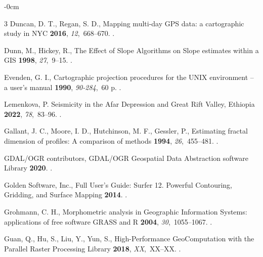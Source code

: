 \documentclass[technologies,article,submit,pdftex,moreauthors]{Definitions/mdpi}
\begin{document}
\begin{adjustwidth}{-\extralength}{0cm}
\begin{thebibliography}{3}
Duncan, D. T., Regan, S. D.,
\newblock Mapping multi-day GPS data: a cartographic study in NYC
 {\bf 2016}, {\em 12},~668--670. 
.

Dunn, M., Hickey, R.,
\newblock The Effect of Slope Algorithms on Slope estimates within a GIS
 {\bf 1998}, {\em 27},~9--15. 
.

Evenden, G. I.,
\newblock Cartographic projection procedures for the UNIX environment – a user's manual
 {\bf 1990}, {\em 90-284},~60 p. 
.

Lemenkova, P. 
\newblock Seismicity in the Afar Depression and Great Rift Valley, Ethiopia
 {\bf 2022}, {\em 78},~83--96. 
.

Gallant, J. C., Moore, I. D., Hutchinson, M. F., Gessler, P.,
\newblock Estimating fractal dimension of profiles: A comparison of methods
 {\bf 1994}, {\em 26},~455--481. 
.

 GDAL/OGR contributors,
\newblock GDAL/OGR Geospatial Data Abstraction software Library
 {\bf 2020}. 
.

Golden Software, Inc.,
\newblock Full User’s Guide: Surfer 12. Powerful Contouring, Gridding, and Surface Mapping
 {\bf 2014}.
.

Grohmann, C. H.,
\newblock Morphometric analysis in Geographic Information Systems: applications of free software GRASS and R
 {\bf 2004}, {\em 30},~1055--1067. 
.

Guan, Q., Hu, S., Liu, Y., Yun, S., 
\newblock High-Performance GeoComputation with the Parallel Raster Processing Library
 {\bf 2018}, {\em XX},~XX--XX. 
.


\end{thebibliography}
\end{adjustwidth}
\end{document}
